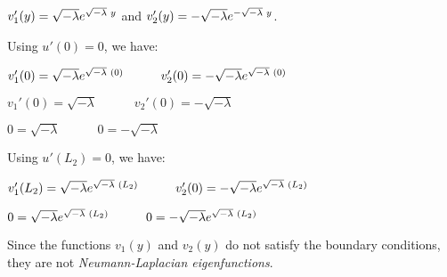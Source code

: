 \documentclass[12pt, executivepaper]{article}
\begin{document}
\begin{flushleft}
\begin{center}
$v_{1}'(y)=\sqrt{-\lambda}e^{\sqrt{-\lambda} \hspace{1mm} y}$ and $v_{2}'(y)=-\sqrt{-\lambda}e^{-\sqrt{-\lambda} \hspace{1mm} y}$.

\end{center}

Using $u'(0)=0$, we have:

\begin{center}

$v_{1}'(0)=\sqrt{-\lambda}e^{\sqrt{-\lambda} \hspace{1mm} (0)} \quad \quad \quad v_{2}'(0)=-\sqrt{-\lambda}e^{\sqrt{-\lambda} \hspace{1mm} (0)}$

$v_{1}'(0)=\sqrt{-\lambda} \quad \quad \quad v_{2}'(0)=-\sqrt{-\lambda}$

$0=\sqrt{-\lambda} \quad \quad \quad 0=-\sqrt{-\lambda}$

\end{center}

\vspace{3mm}

Using $u'(L_{2})=0$, we have:

\begin{center}

$v_{1}'(L_{2})=\sqrt{-\lambda}e^{\sqrt{-\lambda} \hspace{1mm} (L_{2})} \quad \quad \quad v_{2}'(0)=-\sqrt{-\lambda}e^{\sqrt{-\lambda} \hspace{1mm} (L_{2})}$

$0=\sqrt{-\lambda}e^{\sqrt{-\lambda} \hspace{1mm} (L_{2})} \quad \quad \quad 0=-\sqrt{-\lambda}e^{\sqrt{-\lambda} \hspace{1mm} (L_{2})}$

\end{center}

Since the functions $v_{1}(y)$ and $v_{2}(y)$ do not satisfy the boundary conditions, they are not \textit{Neumann-Laplacian eigenfunctions}.

\end{flushleft}

\vspace{5mm}
\end{document}
